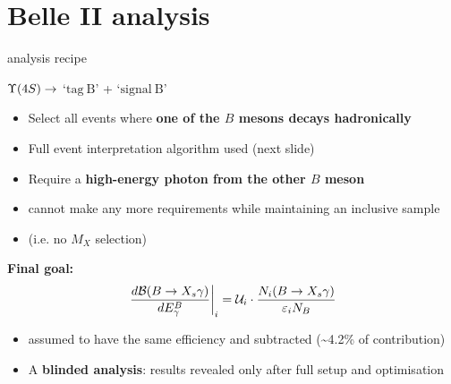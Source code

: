 \documentclass[xcolor=dvipsnames]{beamer}
\begin{document}
   \section{Belle II analysis}

   \begin{frame}{\BtoXsgamma analysis recipe}
      \scriptsize\centering
      
      $\FourS\ra$ `$\mathrm{tag~B}$' + `$\mathrm{signal~B}$'
     
      \vspace{10pt}

      \begin{itemize}
         \item Select all events where \textbf{one of the $B$ mesons decays hadronically}
         \item[\to] Full event interpretation algorithm used (next slide)
         \item Require a \textbf{high-energy photon from the other $B$ meson}
         \item[\to] cannot make any more requirements while maintaining an inclusive sample 
         \item[] (i.e. no $M_X$ selection)
      \end{itemize}
\textbf{Final goal:}
      \begin{equation}\nonumber
         \left.\frac{d\mathcal{B}(\BtoXsgamma)}{d\EB}\right|_i = \mathcal{U}_i \cdot \frac{N_i(\BtoXsgamma)}{\varepsilon_i N_{B}}
      \end{equation}
      \begin{itemize}
         \item \BtoXdgamma assumed to have the same efficiency and subtracted (\sim 4.2\% of contribution)
         \item A \textbf{blinded analysis}: results revealed only after full setup and optimisation
      \end{itemize}

   \end{frame}
\end{document}

